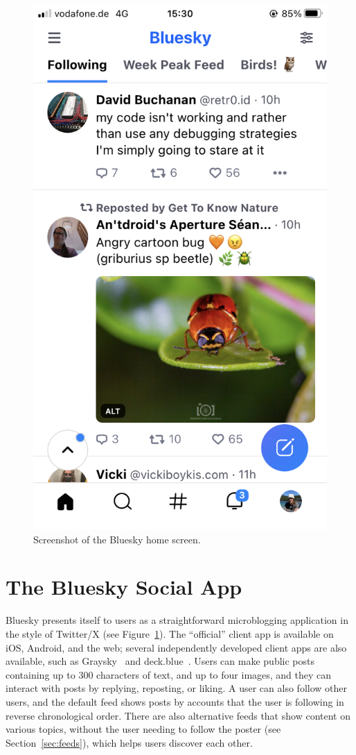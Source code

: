 \documentclass[sigconf,nonacm]{acmart}
\begin{document}
\begin{figure}
    \centering
    \includegraphics[width=0.7\linewidth]{home-feed.png}
    \caption{Screenshot of the Bluesky home screen.}
    \label{fig:home-feed}
\end{figure}

\section{The Bluesky Social App}\label{sec:product}

Bluesky presents itself to users as a straightforward microblogging application in the style of Twitter/X (see Figure~\ref{fig:home-feed}).
The ``official'' client app is available on iOS, Android, and the web; several independently developed client apps are also available, such as Graysky~\cite{Graysky} and deck.blue~\cite{deck.blue}.
Users can make public posts containing up to 300 characters of text, and up to four images, and they can interact with posts by replying, reposting, or liking.
A user can also follow other users, and the default feed shows posts by accounts that the user is following in reverse chronological order.
There are also alternative feeds that show content on various topics, without the user needing to follow the poster (see Section~\ref{sec:feeds}), which helps users discover each other.
\end{document}
